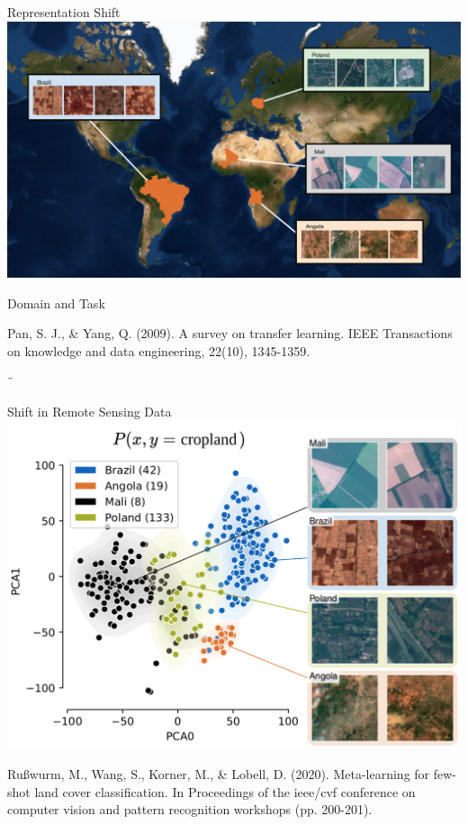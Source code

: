 \documentclass[11pt]{beamer}
\newcommand{\citeapa}[1]{ {\tiny#1\par} }
\begin{document}
	\begin{frame}{Representation Shift}
		\includegraphics[width=\textwidth]{images/countries_globe}
	\end{frame}
	
	\begin{frame}{Domain and Task}
		\vfill\tiny
		\citeapa{Pan, S. J., \& Yang, Q. (2009). A survey on transfer learning. IEEE Transactions on knowledge and data engineering, 22(10), 1345-1359.}
		¨
	\end{frame}

	\begin{frame}{Shift in Remote Sensing Data}
		\includegraphics[width=.9\textwidth]{images/Sen12ms_distribution_shift}
		
		\citeapa{Rußwurm, M., Wang, S., Korner, M., \& Lobell, D. (2020). Meta-learning for few-shot land cover classification. In Proceedings of the ieee/cvf conference on computer vision and pattern recognition workshops (pp. 200-201).}
	\end{frame}
	
\end{document}
